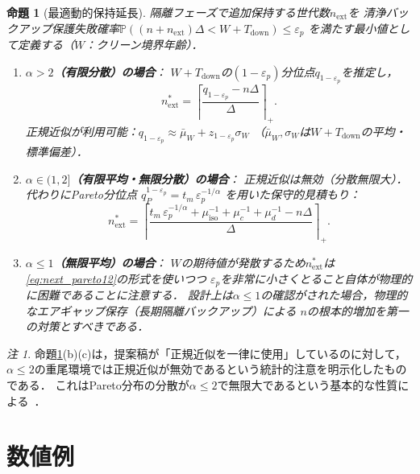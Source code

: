 \documentclass[12pt,a4paper]{article}
\theoremstyle{plain}
\newtheorem{proposition}[theorem]{命題}
\theoremstyle{definition}
\theoremstyle{remark}
\newtheorem{remark}[theorem]{注}
\newcommand{\Prob}{\mathbb{P}}
\newcommand{\Tdown}{T_{\mathrm{down}}}
\begin{document}
\begin{proposition}[最適動的保持延長]\label{prop:next}
隔離フェーズで追加保持する世代数$n_{\mathrm{ext}}$を
清浄バックアップ保護失敗確率$\Prob((n+n_{\mathrm{ext}})\Delta<W+\Tdown)\le\varepsilon_p$
を満たす最小値として定義する（$W$：クリーン境界年齢）．

\begin{enumerate}[label=(\alph*)]
\item \textbf{$\alpha>2$（有限分散）の場合}：
  $W+\Tdown$の$(1-\varepsilon_p)$分位点$q_{1-\varepsilon_p}$を推定し，
  \begin{equation}\label{eq:next_normal}
    n_{\mathrm{ext}}^* = \left\lceil\frac{q_{1-\varepsilon_p}-n\Delta}{\Delta}\right\rceil_+.
  \end{equation}
  正規近似が利用可能：$q_{1-\varepsilon_p}\approx\bar\mu_W+z_{1-\varepsilon_p}\sigma_W$
  （$\bar\mu_W,\sigma_W$は$W+\Tdown$の平均・標準偏差）．

\item \textbf{$\alpha\in(1,2]$（有限平均・無限分散）の場合}：
  正規近似は無効（分散無限大）．代わりにPareto分位点
  $q_P^{1-\varepsilon_p}=t_m\,\varepsilon_p^{-1/\alpha}$
  を用いた保守的見積もり：
  \begin{equation}\label{eq:next_pareto12}
    n_{\mathrm{ext}}^* = \left\lceil\frac{t_m\,\varepsilon_p^{-1/\alpha}
    +\mu_{\mathrm{iso}}^{-1}+\mu_c^{-1}+\mu_d^{-1}-n\Delta}{\Delta}\right\rceil_+.
  \end{equation}

\item \textbf{$\alpha\le1$（無限平均）の場合}：
  $W$の期待値が発散するため$n_{\mathrm{ext}}^*$は\eqref{eq:next_pareto12}の形式を使いつつ
  $\varepsilon_p$を非常に小さくとること自体が物理的に困難であることに注意する．
  設計上は$\alpha\le1$の確認がされた場合，物理的なエアギャップ保存（長期隔離バックアップ）による
  $n$の根本的増加を第一の対策とすべきである．
\end{enumerate}
\end{proposition}

\begin{remark}
命題\ref{prop:next}(b)(c)は，提案稿が「正規近似を一律に使用」しているのに対して，
$\alpha\le2$の重尾環境では正規近似が無効であるという統計的注意を明示化したものである．
これはPareto分布の分散が$\alpha\le2$で無限大であるという基本的な性質による~\cite{embrechts1997}．
\end{remark}

\section{数値例}
\label{sec:numerical}
\end{document}
